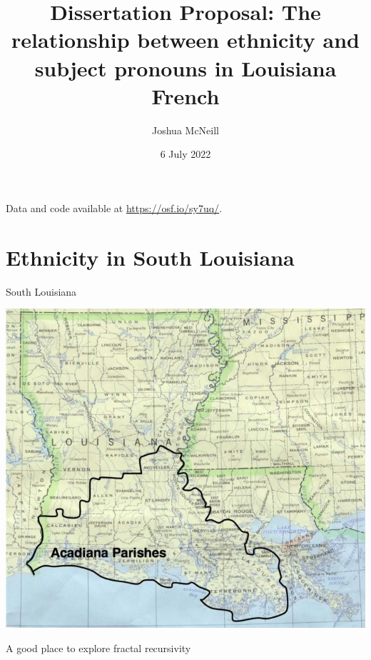 \documentclass{beamer}\usepackage[]{graphicx}\usepackage[]{color}
\title[Ethnicity and subject pronouns]{Dissertation Proposal: The relationship between ethnicity and subject pronouns in Louisiana French}
\author{Joshua McNeill}
\institute{University of Georgia}
\date{6 July 2022}
\begin{document}
  \begin{frame}
    \titlepage
    \tiny{
      Data and code available at \url{https://osf.io/sy7uq/}.
    }
  \end{frame}

  \begin{frame}
    \tableofcontents[hideallsubsections]
  \end{frame}


  \section{Ethnicity in South Louisiana}
    \begin{frame}{South Louisiana}
      \begin{center}
        \includegraphics[scale=0.27]{acadiana.jpg}
      \end{center}
      A good place to explore fractal recursivity \parencite{irvine_language_2000}
    \end{frame}
\end{document}
